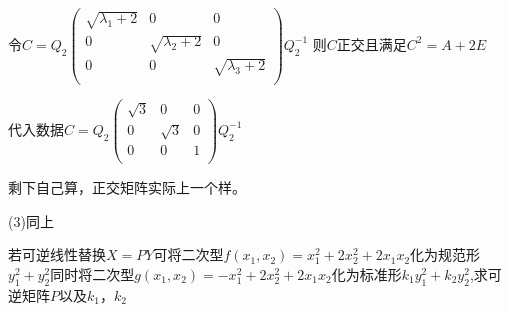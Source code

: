 \documentclass[lang=cn,10pt]{elegantbook}
\begin{document}
\begin{solution}
	令$C=Q_{2}\left( \begin{matrix}
		\sqrt{\lambda _1+2}&		0&		0\\
		0&		\sqrt{\lambda _2+2}&		0\\
		0&		0&		\sqrt{\lambda _3+2}\\
	\end{matrix} \right)Q_{2}^{-1}$ 
	则$C$正交且满足$C^{2}=A+2E$
	
	代入数据$C=Q_{2}\left( \begin{matrix}
		\sqrt{3}&		0&		0\\
		0&		\sqrt{3}&		0\\
		0&		0&		1\\
	\end{matrix} \right)Q_{2}^{-1}$
	
	剩下自己算，正交矩阵实际上一个样。
	
	(3)同上
\end{solution}
\begin{example}
	若可逆线性替换$X=PY$可将二次型$f(x_{1},x_{2})=x_{1}^{2}+2x_{2}^{2}+2x_{1}x_{2}$化为规范形$y^{2}_{1}+y^{2}_{2}$同时将二次型$g(x_{1},x_{2})=-x_{1}^{2}+2x_{2}^{2}+2x_{1}x_{2}$化为标准形$k_{1}y^{2}_{1}+k_{2}y^{2}_{2}$,求可逆矩阵$P$以及$k_{1}，k_{2}$
\end{example}
\end{document}
